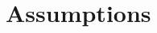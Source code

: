 \documentclass[11pt]{article}
\newcommand{\E}{\mathbb{E}}
\theoremstyle{definition}
\theoremstyle{plain}
\theoremstyle{remark}
\begin{document}
%

\section{Assumptions}
\end{document}

